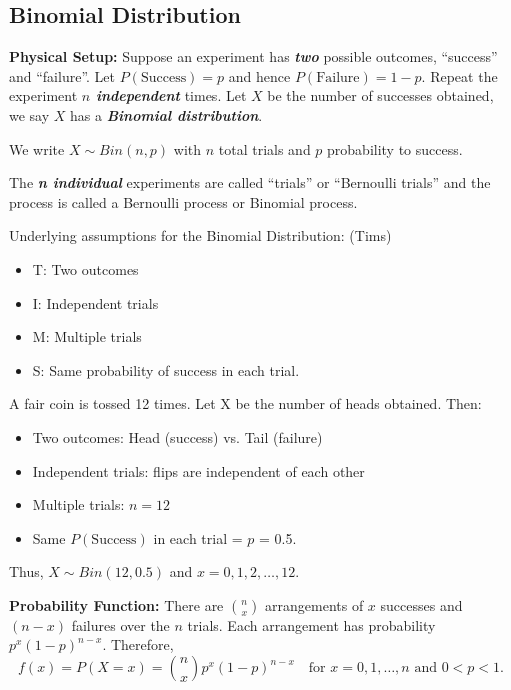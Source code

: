 \subsection{Binomial Distribution}

\textbf{Physical Setup:} Suppose an experiment has \textbf{\textit{two}} possible outcomes, ``success'' and ``failure''.
Let $P(\text{Success}) = p$ and hence $P(\text{Failure}) = 1-p$. Repeat the experiment \textbf{\textit{$n$ independent}} times.
Let $X$ be the number of successes obtained, we say $X$ has a \textbf{\textit{Binomial distribution}}.


We write \( X \sim Bin(n, p) \) with $n$ total trials and $p$ probability to success.

\begin{note}
    The \textbf{\textit{n individual}} experiments are called “trials” or “Bernoulli trials” and the process is
    called a Bernoulli process or Binomial process. \\
\end{note}


Underlying assumptions for the Binomial Distribution: (Tims)
\begin{itemize}
    \item T: Two outcomes
    \item I: Independent trials
    \item M: Multiple trials
    \item S: Same probability of success in each trial.
\end{itemize}

\begin{example}
    A fair coin is tossed 12 times. Let X be the number of heads obtained. Then:
    \begin{itemize}
        \item Two outcomes: Head (success) vs. Tail (failure)
        \item Independent trials: flips are independent of each other
        \item Multiple trials: $n = 12$
        \item Same $P(\text{Success})$ in each trial = $p$ = 0.5.
    \end{itemize}
    Thus, $X \sim Bin(12, 0.5)$ and $x = 0,1,2, \ldots ,12$. \\
\end{example}

\textbf{Probability Function:} There are $\binom{n}{x}$ arrangements of $x$ successes and $(n-x)$ failures over the $n$ trials.
Each arrangement has probability $p^x(1-p)^{n-x}$. Therefore,
\[f(x) = P(X=x) = \binom{n}{x}p^x(1-p)^{n-x} \quad \text{for $x = 0,1,\ldots ,n$ and $0 < p < 1$}.\]

